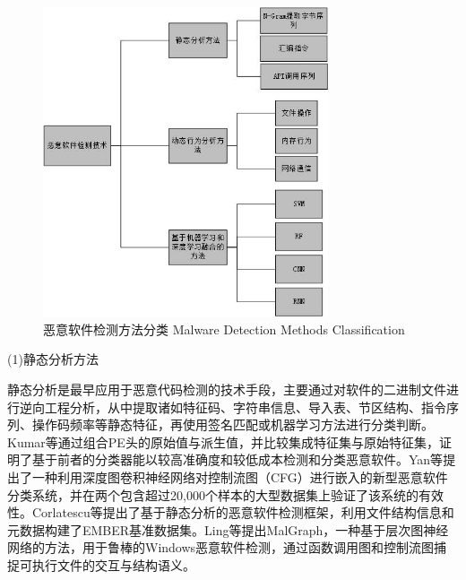 \begin{figure}[hbt]
	\centering
	\includegraphics[width=0.75\textwidth]{figures/2.2}
	\caption{恶意软件检测方法分类 Malware Detection Methods Classification}\label{fig:2.2}
\end{figure}

 
(1)静态分析方法

静态分析是最早应用于恶意代码检测的技术手段，主要通过对软件的二进制文件进行逆向工程分析，从中提取诸如特征码、字符串信息、导入表、节区结构、指令序列、操作码频率等静态特征，再使用签名匹配或机器学习方法进行分类判断。Kumar等\cite{kumar2019learning}通过组合PE头的原始值与派生值，并比较集成特征集与原始特征集，证明了基于前者的分类器能以较高准确度和较低成本检测和分类恶意软件。Yan等\cite{yan2019classifying}提出了一种利用深度图卷积神经网络对控制流图（CFG）进行嵌入的新型恶意软件分类系统，并在两个包含超过20,000个样本的大型数据集上验证了该系统的有效性。Corlatescu等\cite{corlatescu2023embersim}提出了基于静态分析的恶意软件检测框架，利用文件结构信息和元数据构建了EMBER基准数据集。Ling等\cite{ling2022malgraph}提出MalGraph，一种基于层次图神经网络的方法，用于鲁棒的Windows恶意软件检测，通过函数调用图和控制流图捕捉可执行文件的交互与结构语义。

